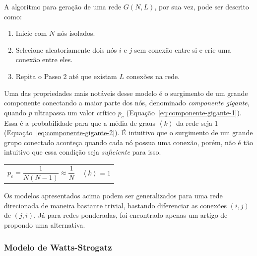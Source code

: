 \documentclass[12pt,a4paper]{article}
\theoremstyle{hypo}
\newcommand{\avg}[1]{\left\langle #1 \right\rangle} %
\begin{document}
A algoritmo para geração de uma rede $G(N, L)$, por sua vez,  pode ser descrito como:

\begin{enumerate}
\item Inicie com $N$ nós isolados.
\item Selecione aleatoriamente dois nós $i$ e $j$ sem conexão entre si e crie uma conexão entre eles.
\item Repita o Passo 2 até que existam $L$ conexões na rede.
\end{enumerate}

Uma das propriedades mais notáveis desse modelo é o surgimento de um grande componente conectando a maior parte dos nós, denominado \textit{componente gigante}, quando $p$ ultrapassa um valor crítico $p_c$ (Equação~\ref{eq:componente-gigante-1}). Essa é a probabilidade para que a média de graus $\avg{k}$ da rede seja 1 (Equação~\ref{eq:componente-gigante-2}). É intuitivo que o surgimento de um grande grupo conectado aconteça quando cada nó possua uma conexão, porém, não é tão intuitivo que essa condição seja \textit{suficiente} para isso.

\noindent
\begin{tabularx}{\linewidth}{@{}XX@{}}
    \begin{equation} \label{eq:componente-gigante-1}
        p_c = \frac{1}{N(N - 1)} \approx \frac{1}{N}
    \end{equation} &
    \begin{equation} \label{eq:componente-gigante-2}
        \avg{k} = 1
    \end{equation}
\end{tabularx}

Os modelos apresentados acima podem ser generalizados para uma rede direcionada de maneira bastante trivial, bastando diferenciar as conexões $(i, j)$ de $(j, i)$. Já para redes ponderadas, foi encontrado apenas um artigo de  propondo uma alternativa.

\subsubsection{Modelo de Watts-Strogatz}
\end{document}
